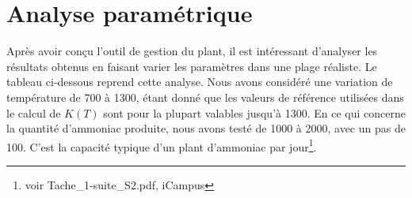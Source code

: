 \section{Analyse paramétrique}

Après avoir conçu l'outil de gestion du plant, il est intéressant d'analyser les résultats obtenus en faisant varier les 
paramètres dans une plage réaliste. Le tableau ci-dessous reprend cette analyse. Nous avons considéré une variation de 
température de \unit{700}{\kelvin} à \unit{1300}{\kelvin}, étant donné que les valeurs de référence utilisées dans le 
calcul de $K(T)$ sont pour la plupart valables jusqu'à \unit{1300}{\kelvin}. En ce qui concerne la quantité d'ammoniac 
produite, nous avons testé de \unit{1000}{\ton} à \unit{2000}{\ton}, avec un pas de \unit{100}{\ton}. C'est la capacité 
typique d'un plant d'ammoniac par jour\footnote{voir Tache_1-suite_S2.pdf, iCampus}.

